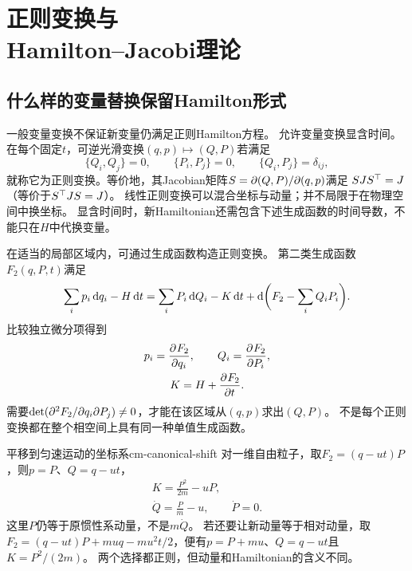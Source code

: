 \chapter[正则变换与Hamilton--Jacobi理论]{正则变换与\\Hamilton--Jacobi理论}

\section{什么样的变量替换保留Hamilton形式}
一般变量变换不保证新变量仍满足正则Hamilton方程。
允许变量变换显含时间。在每个固定$t$，可逆光滑变换$(q,p) \mapsto (Q,P)$若满足
\begin{equation}
 \{Q_i,Q_j\} = 0,\qquad \{P_i,P_j\} = 0,\qquad \{Q_i,P_j\} = \delta_{ij},
\end{equation}
就称它为正则变换。等价地，其Jacobian矩阵$S = \partial(Q,P)/\partial(q,p)$满足
$SJS^\top = J$（等价于$S^\top JS = J$）。
线性正则变换可以混合坐标与动量；并不局限于在物理空间中换坐标。
显含时间时，新Hamiltonian还需包含下述生成函数的时间导数，不能只在$H$中代换变量。

在适当的局部区域内，可通过生成函数构造正则变换。
第二类生成函数$F_2(q,P,t)$满足
\begin{equation}
 \sum_i p_i\mathop{}\!\mathrm{d} q_i - H\mathop{}\!\mathrm{d} t
 = \sum_iP_i\mathop{}\!\mathrm{d} Q_i - K\mathop{}\!\mathrm{d} t + \mathop{}\!\mathrm{d}\biggl(F_2 - \sum_iQ_iP_i\biggr).
\end{equation}
比较独立微分项得到
\begin{subequations}\label{eq:cm-f2}
 \begin{gather}
  p_i = \frac{\partial^{}F_2}{\partial{q_i}^{}},\qquad Q_i = \frac{\partial^{}F_2}{\partial{P_i}^{}},\\
  K = H + \frac{\partial^{}F_2}{\partial{t}^{}}.
 \end{gather}
\end{subequations}
需要$\det(\partial^2F_2/\partial q_i\partial P_j) \ne 0$，才能在该区域从$(q,p)$求出$(Q,P)$。
不是每个正则变换都在整个相空间上具有同一种单值生成函数。

\begin{example}{平移到匀速运动的坐标系}{cm-canonical-shift}
对一维自由粒子，取$F_2 = (q - ut)P$，则$p = P$、$Q = q - ut$，
\begin{subequations}
 \begin{gather}
  K = \frac{P^2}{2m} - uP,\\
  \dot Q = \frac Pm - u,\qquad \dot P = 0.
 \end{gather}
\end{subequations}
这里$P$仍等于原惯性系动量，不是$m\dot Q$。
若还要让新动量等于相对动量，取
$F_2 = (q - ut)P + muq - mu^2t/2$，便有$p = P + mu$、$Q = q - ut$且$K = P^2/(2m)$。
两个选择都正则，但动量和Hamiltonian的含义不同。
\end{example}

